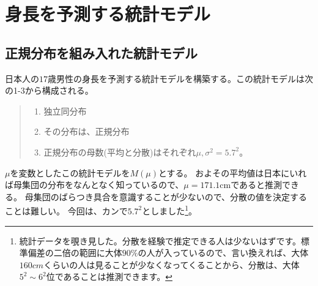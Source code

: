 
\chapter{身長を予測する統計モデル}
\section{正規分布を組み入れた統計モデル}
日本人の$17$歳男性の身長を予測する統計モデルを構築する。この統計モデルは次の1-3から構成される。
\begin{quote}
    \begin{enumerate}[(1)]
    \item 独立同分布
    \item その分布は、正規分布
    \item 正規分布の母数(平均と分散)はそれぞれ$\mu,\sigma^2=5.7^2$。
    \end{enumerate}
\end{quote}

$\mu$を変数としたこの統計モデルを$M(\mu)$とする。
およその平均値は日本にいれば母集団の分布をなんとなく知っているので、$\mu=171.1\mathrm{cm}$であると推測できる。
母集団のばらつき具合を意識することが少ないので、分散の値を決定することは難しい。
今回は、カンで$5.7^2$としました\footnote{統計データを覗き見した。分散を経験で推定できる人は少ないはずです。標準偏差の二倍の範囲に大体$90\%$の人が入っているので、言い換えれば、大体$160cm$くらいの人は見ることが少なくなってくることから、分散は、大体$5^2\sim 6^2$位であることは推測できます。}。


